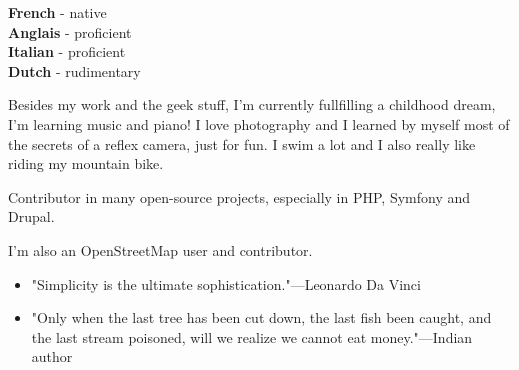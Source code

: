 
\begin{minipage}[t]{.2\textwidth}
	\vspace{-\baselineskip} %


	\textbf{French} - native\\
	\textbf{Anglais} - proficient\\
	\textbf{Italian} - proficient\\
	\textbf{Dutch} - rudimentary\\
\end{minipage}
\hfill
\begin{minipage}[t]{.45\textwidth}
	\vspace{-\baselineskip} %


    Besides my work and the geek stuff, I’m currently fullfilling a childhood dream, I’m learning music and piano!
    I love photography and I learned by myself most of the secrets of a reflex camera, just for fun.
    I swim a lot and I also really like riding my mountain bike.
\end{minipage}
\hfill
\begin{minipage}[t]{.30\textwidth}
	\vspace{-\baselineskip} %


    Contributor in many open-source projects, especially in PHP, Symfony and Drupal.

    I'm also an OpenStreetMap user and contributor.
\end{minipage}
\hfill
\vspace*{\fill}
\begin{minipage}[t]{\textwidth}
	\vspace{-\baselineskip} %


    \begin{itemize}
        \item "Simplicity is the ultimate sophistication."{\tiny{---Leonardo Da Vinci}}
        \item "Only when the last tree has been cut down, the last fish been caught, and the last stream poisoned, will we realize we cannot eat money."{\tiny{---Indian author}}
    \end{itemize}
\end{minipage}

